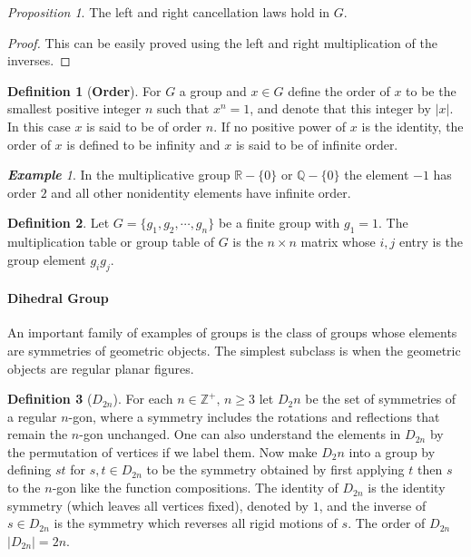 \documentclass[paper=a4, fontsize=11pt]{scrartcl}
\numberwithin{equation}{section}		%
\numberwithin{figure}{section}			%
\numberwithin{table}{section}				%
\theoremstyle{definition}
\newtheorem{definition}{Definition}[section]
\theoremstyle{remark}
\theoremstyle{example}
\newtheorem{example}{\textbf{Example}}[section]
\newtheorem{prop}{Proposition}[section]
\begin{document}
\begin{prop}
    The left and right cancellation laws hold in $G$.
\end{prop}

\begin{proof}
    This can be easily proved using the left and right multiplication of the inverses.
\end{proof}

\begin{definition}[\textbf{Order}]
    For $G$ a group and $x \in G$ define the order of $x$ to be the smallest positive integer $n$ such that $x^n = 1$, and denote that this integer by $\lvert x \rvert$. In this case $x$ is said to be of order $n$. If no positive power of $x$ is the identity, the order of $x$ is defined to be infinity and $x$ is said to be of infinite order.
\end{definition}

\begin{example}
    In the multiplicative group $\mathbb{R} - \{0\}$ or $\mathbb{Q} - \{0\}$ the element $-1$ has order $2$ and all other nonidentity elements have infinite order.
\end{example}

\begin{definition}
    Let $G = \{g_1, g_2, \cdots, g_n\}$ be a finite group with $g_1 = 1$. The multiplication table or group table of $G$ is the $n \times n$ matrix whose $i,j$ entry is the group element $g_ig_j$.
\end{definition}

\paragraph{Dihedral Group}

An important family of examples of groups is the class of groups whose elements are symmetries of geometric objects. The simplest subclass is when the geometric objects are regular planar figures.

\begin{definition}[\textbf{$D_{2n}$}]
    For each $n \in \mathbb{Z}^{+}, \, n \geq 3$ let $D_2n$ be the set of symmetries of a regular $n$-gon, where a symmetry includes the rotations and reflections that remain the $n$-gon unchanged. One can also understand the elements in $D_{2n}$ by the permutation of vertices if we label them. Now make $D_2n$ into a group by defining $st$ for $s,t \in D_{2n}$ to be the symmetry obtained by first applying $t$ then $s$ to the $n$-gon like the function compositions. The identity of $D_{2n}$ is the identity symmetry (which leaves all vertices fixed), denoted by $1$, and the inverse of $s \in D_{2n}$ is the symmetry which reverses all rigid motions of $s$. The order of $D_{2n}$ $\lvert D_{2n} \rvert = 2n$.
\end{definition}
\end{document}
